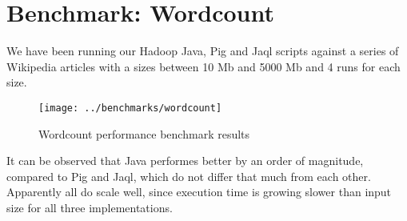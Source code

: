\section{Benchmark: Wordcount}            

We have been running our Hadoop Java, Pig and Jaql scripts against a series of Wikipedia articles with a sizes between 10 Mb and 5000 Mb and 4 runs for each size.

\begin{figure}[h!]
  \begin{center}
    \texttt{[image: ../benchmarks/wordcount]}
  \end{center}
  \caption{Wordcount performance benchmark results}
  \label{fig:reducers}
\end{figure}

It can be observed that Java performes better by an order of magnitude, compared to Pig and Jaql, which do not differ that much from each other. Apparently all do scale well, since execution time is growing slower than input size for all three implementations.